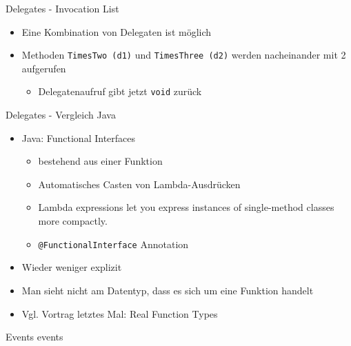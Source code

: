 \documentclass[11pt]{beamer}
\begin{document}
\begin{frame}{Delegates - Invocation List}
	\begin{itemize}
		\item  Eine Kombination von Delegaten ist möglich
		\item Methoden \texttt{TimesTwo (d1)} und \texttt{TimesThree (d2)} werden nacheinander mit 2 aufgerufen
		\begin{itemize}
			\item Delegatenaufruf gibt jetzt \texttt{void} zurück
		\end{itemize}
	\end{itemize}
\end{frame}

\begin{frame}{Delegates - Vergleich Java}
	\begin{itemize}
		\item Java: Functional Interfaces
		\begin{itemize}
			\item bestehend aus einer Funktion
			\item Automatisches Casten von Lambda-Ausdrücken
			\item \glqq Lambda expressions let you express instances of single-method classes more compactly.\grqq
			\item \texttt{@FunctionalInterface} Annotation		
		\end{itemize}
		\item Wieder weniger explizit
		\item Man sieht nicht am Datentyp, dass es sich um eine Funktion handelt
		\item Vgl. Vortrag letztes Mal: \glqq Real Function Types\grqq
	\end{itemize}
\end{frame}

\begin{frame}{Events}
	events
\end{frame}

\end{document}
